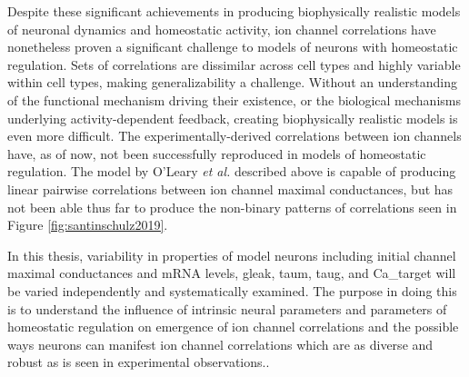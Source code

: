 Despite these significant achievements in producing biophysically realistic models of neuronal dynamics and homeostatic activity, ion channel correlations have nonetheless proven a significant challenge to models of neurons with homeostatic regulation. Sets of correlations are dissimilar across cell types and highly variable within cell types, making generalizability a challenge. Without an understanding of the functional mechanism driving their existence, or the biological mechanisms underlying activity-dependent feedback, creating biophysically realistic models is even more difficult\cite{schulz_quantitative_2007}.
The experimentally-derived correlations between ion channels have, as of now, not been successfully reproduced in models of homeostatic regulation\cite{schulz_variable_2006,schulz_quantitative_2007,oleary_correlations_2013,oleary_cell_2014,liu_model_1998}.
The model by O'Leary \textit{et al.} described above is capable of producing linear pairwise correlations between ion channel maximal conductances, but has not been able thus far to produce the non-binary patterns of correlations seen in Figure \ref{fig:santinschulz2019}\cite{oleary_cell_2014}.

In this thesis, variability in properties of model neurons including initial channel maximal conductances and mRNA levels, \acf{gleak}, \acf{taum}, \acf{taug}, and \acf{Ca_target} will be varied independently and systematically examined. The purpose in doing this is to understand the influence of intrinsic neural parameters and parameters of homeostatic regulation on emergence of ion channel correlations and the possible ways neurons can manifest ion channel correlations which are as diverse and robust as is seen in experimental observations.\cite{schulz_variable_2006,schulz_quantitative_2007}.

